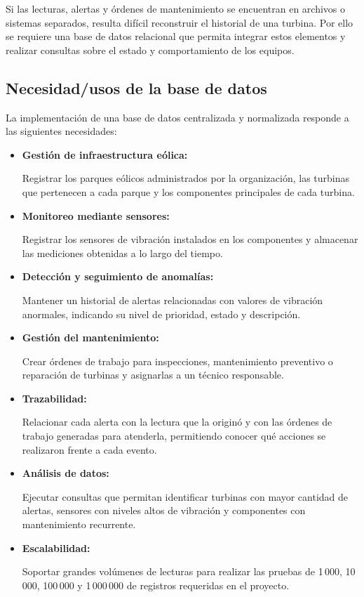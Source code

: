 \documentclass[11pt,a4paper]{article}
\begin{document}
Si las lecturas, alertas y órdenes de mantenimiento se encuentran en archivos o
sistemas separados, resulta difícil reconstruir el historial de una turbina. Por ello
se requiere una base de datos relacional que permita integrar estos elementos y
realizar consultas sobre el estado y comportamiento de los equipos.

\subsection{Necesidad/usos de la base de datos}

La implementación de una base de datos centralizada y normalizada responde a las
siguientes necesidades:

\begin{itemize}
    \item \textbf{Gestión de infraestructura eólica:}

    Registrar los parques eólicos administrados por la organización, las turbinas que
    pertenecen a cada parque y los componentes principales de cada turbina.

    \item \textbf{Monitoreo mediante sensores:}

    Registrar los sensores de vibración instalados en los componentes y almacenar las
    mediciones obtenidas a lo largo del tiempo.

    \item \textbf{Detección y seguimiento de anomalías:}

    Mantener un historial de alertas relacionadas con valores de vibración anormales,
    indicando su nivel de prioridad, estado y descripción.

    \item \textbf{Gestión del mantenimiento:}

    Crear órdenes de trabajo para inspecciones, mantenimiento preventivo o reparación
    de turbinas y asignarlas a un técnico responsable.

    \item \textbf{Trazabilidad:}

    Relacionar cada alerta con la lectura que la originó y con las órdenes de trabajo
    generadas para atenderla, permitiendo conocer qué acciones se realizaron frente a
    cada evento.

    \item \textbf{Análisis de datos:}

    Ejecutar consultas que permitan identificar turbinas con mayor cantidad de alertas,
    sensores con niveles altos de vibración y componentes con mantenimiento recurrente.

    \item \textbf{Escalabilidad:}

    Soportar grandes volúmenes de lecturas para realizar las pruebas de 1\,000,
    10\,000, 100\,000 y 1\,000\,000 de registros requeridas en el proyecto.
\end{itemize}
\end{document}
